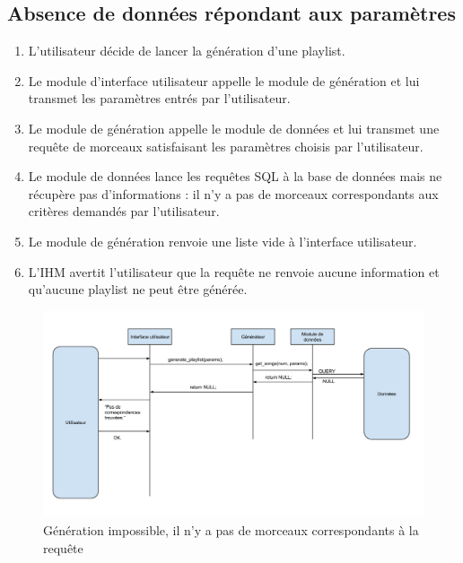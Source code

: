 \subsection{Absence de données répondant aux paramètres}
\label{scenarii:gen:nodata}

\begin{enumerate}
\item L'utilisateur décide de lancer la génération d'une playlist.
\item Le module d'interface utilisateur appelle le module de génération et 
lui transmet les paramètres entrés par l'utilisateur.
\item Le module de génération appelle le module de données et lui transmet 
une requête de morceaux satisfaisant les paramètres choisis par l'utilisateur.
\item Le module de données lance les requêtes SQL à la base de données mais 
ne récupère pas d'informations : il n'y a pas de morceaux correspondants aux 
critères demandés par l'utilisateur.
\item Le module de génération renvoie une liste vide à l'interface 
utilisateur.
\item L'IHM avertit l'utilisateur que la requête ne renvoie aucune 
information et qu'aucune playlist ne peut être générée.
\end{enumerate}

\begin{figure}[!h]
\includegraphics[width=14cm]{data/generation_nulle.png}
\caption{Génération impossible, il n'y a pas de morceaux correspondants à la requête}
\end{figure}